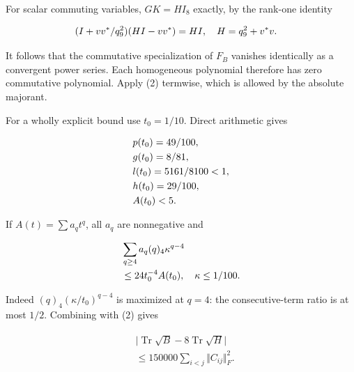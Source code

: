 For scalar commuting variables, \(G K=H I_{8}\) exactly, by the rank-one
identity

\begin{gather*}
\begin{aligned}
& (I+vv^{*}/q_{9}^{2})(H I-vv^{*})=H I, \quad  H=q_{9}^{2}+v^{*}v.
\end{aligned}\notag
\end{gather*}

It follows that the commutative specialization of \(F_{B}\) vanishes
identically as a convergent power series. Each homogeneous polynomial
therefore has zero commutative polynomial. Apply (2) termwise, which is
allowed by the absolute majorant.

For a wholly explicit bound use \(t_{0}=1/10\). Direct arithmetic gives

\begin{gather*}
\begin{aligned}
& p(t_{0})=49/100, \\
& g(t_{0})=8/81, \\
& l(t_{0})=5161/8100<1, \\
& h(t_{0})=29/100, \\
& A(t_{0})<5.
\end{aligned}\notag
\end{gather*}

If \(A(t)=\sum  a_{q} t^{q}\), all \(a_{q}\) are nonnegative and

\begin{gather*}
\begin{aligned}
& \sum _{q\ge 4} a_{q} (q)_{4} \kappa ^{q-4} \\
& \le 24 t_{0}^{-4} A(t_{0}), \quad  \kappa  \le 1/100.
\end{aligned}\notag
\end{gather*}

Indeed \((q)_{4}( \kappa  /t_{0})^{q-4}\) is maximized at \(q=4\): the
consecutive-term ratio is at most \(1/2\). Combining with (2) gives

\begin{gather*}
\begin{aligned}
& \vert \operatorname{Tr}  \sqrt{B}-8\operatorname{Tr}  \sqrt{H}\vert \\
& \le 150000 \sum _{i<j}\Vert C_{ij}\Vert _{F}^{2}.
\end{aligned}\tag{6}
\end{gather*}

